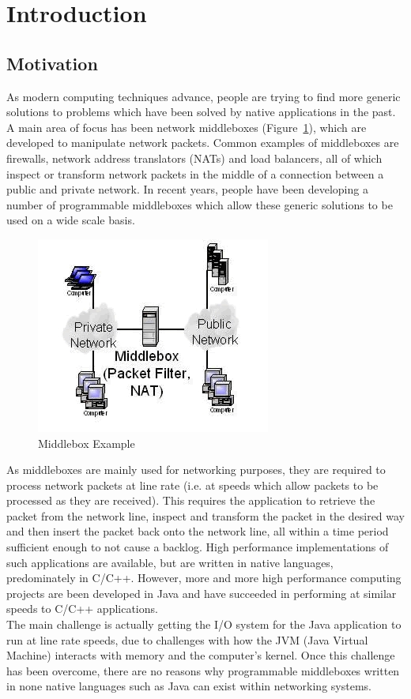 \documentclass[interim_report.tex]{subfiles}
\begin{document}
\section{Introduction}
\subsection{Motivation}
As modern computing techniques advance, people are trying to find more generic solutions to problems which have been solved by native applications in the past. A main area of focus has been network middleboxes (Figure~\ref{fig:middlebox}), which are developed to manipulate network packets. Common examples of middleboxes are firewalls, network address translators (NATs) and load balancers, all of which inspect or transform network packets in the middle of a connection between a public and private network. In recent years, people have been developing a number of programmable middleboxes which allow these generic solutions to be used on a wide scale basis.

\begin{figure}[H]
	\centering
	\includegraphics[scale=0.75]{img/middleboxes.jpg}
	\caption{Middlebox Example \cite{middlebox}}
	\label{fig:middlebox}
\end{figure}

\noindent As middleboxes are mainly used for networking purposes, they are required to process network packets at line rate (i.e. at speeds which allow packets to be processed as they are received). This requires the application to retrieve the packet from the network line, inspect and transform the packet in the desired way and then insert the packet back onto the network line, all within a time period sufficient enough to not cause a backlog. High performance implementations of such applications are available, but are written in native languages, predominately in C/C++. However, more and more high performance computing projects are been developed in Java and have succeeded in performing at similar speeds to C/C++ applications. \\
\newline
The main challenge is actually getting the I/O system for the Java application to run at line rate speeds, due to challenges with how the JVM (Java Virtual Machine) interacts with memory and the computer's kernel. Once this challenge has been overcome, there are no reasons why programmable middleboxes written in none native languages such as Java can exist within networking systems.
\end{document}
